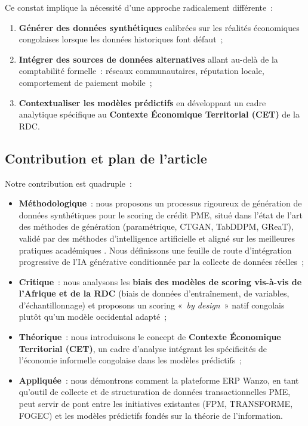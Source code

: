 \documentclass[12pt, a4paper, twocolumn]{article}
\begin{document}
Ce constat implique la nécessité d'une approche radicalement différente~:

\begin{enumerate}[leftmargin=*]
  \item \textbf{Générer des données synthétiques} calibrées sur les réalités économiques congolaises lorsque les données historiques font défaut~;
  \item \textbf{Intégrer des sources de données alternatives} allant au-delà de la comptabilité formelle~: réseaux communautaires, réputation locale, comportement de paiement mobile~;
  \item \textbf{Contextualiser les modèles prédictifs} en développant un cadre analytique spécifique au \textbf{Contexte Économique Territorial (CET)} de la RDC.
\end{enumerate}

\subsection{Contribution et plan de l'article}
\label{subsec:contribution}

Notre contribution est quadruple~:

\begin{itemize}[leftmargin=*]
  \item \textbf{Méthodologique}~: nous proposons un processus rigoureux de génération de données synthétiques pour le scoring de crédit PME, situé dans l'état de l'art des méthodes de génération (paramétrique, CTGAN, TabDDPM, GReaT), validé par des méthodes d'intelligence artificielle et aligné sur les meilleures pratiques académiques \cite{xia2024, nguyen2020}. Nous définissons une feuille de route d'intégration progressive de l'IA générative conditionnée par la collecte de données réelles~;
  \item \textbf{Critique}~: nous analysons les \textbf{biais des modèles de scoring vis-à-vis de l'Afrique et de la RDC} (biais de données d'entraînement, de variables, d'échantillonnage) et proposons un scoring «~\textit{by design}~» natif congolais plutôt qu'un modèle occidental adapté~;
  \item \textbf{Théorique}~: nous introduisons le concept de \textbf{Contexte Économique Territorial (CET)}, un cadre d'analyse intégrant les spécificités de l'économie informelle congolaise dans les modèles prédictifs~;
  \item \textbf{Appliquée}~: nous démontrons comment la plateforme ERP Wanzo, en tant qu'outil de collecte et de structuration de données transactionnelles PME, peut servir de pont entre les initiatives existantes (FPM, TRANSFORME, FOGEC) et les modèles prédictifs fondés sur la théorie de l'information.
\end{itemize}
\end{document}
